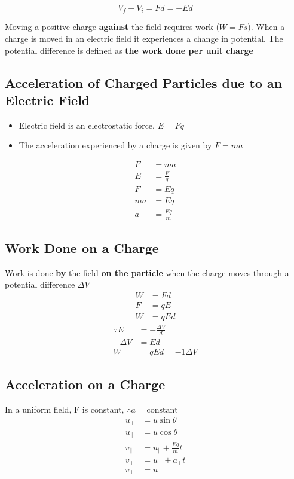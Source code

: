 		$$V_f - V_i = Fd = -Ed$$

		Moving a positive charge \textbf{against} the field requires work ($W=Fs$). When a charge is moved in an electric field it experiences a change in potential. The potential difference is defined as \textbf{the work done per unit charge}

	\subsection{Acceleration of Charged Particles due to an Electric Field}
		\begin{itemize}
			\item Electric field is an electrostatic force, $E=Fq$
			\item The acceleration experienced by a charge is given by $F=ma$
		\end{itemize}
		\begin{align*}
			F &= ma \\
			E &= \frac{F}{q} \\
			F &= Eq \\
			ma &= Eq \\
			a &= \frac{Eq}{m}
		\end{align*}

	\subsection{Work Done on a Charge}
		Work is done \textbf{by} the field \textbf{on the particle} when the charge moves through a potential difference $\Delta V$
		\begin{align*}
			W &= Fd \\
			F &= qE \\
			W &= qEd
		\end{align*}
		\begin{align*}
			\because E &= -\frac{\Delta V}{d} \\
			-\Delta V &= Ed \\
			W &= qEd = -1 \Delta V
		\end{align*}

	\subsection{Acceleration on a Charge}
		In a uniform field, F is constant, $\therefore a = \text{constant}$
		\begin{align*}
			u_{\perp} &= u\sin{\theta} \\
			u_{\parallel} &= u\cos{\theta} \\
			v_{\parallel} &= u_{\parallel} + \frac{Eq}{m}t \\
			v_\perp &= u_\perp + a_\perp t \\
			v_\perp &= u_\perp
		\end{align*}

